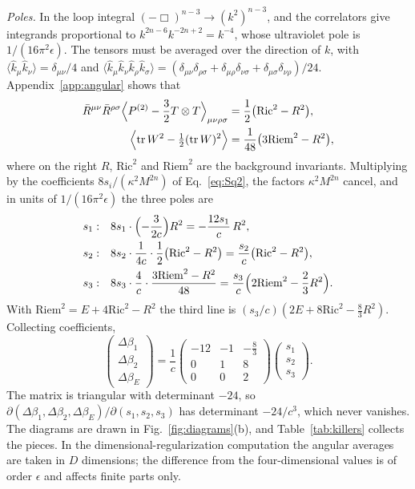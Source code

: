 \documentclass[a4paper,11pt]{article}
\newcommand{\Pt}{P^{(2)}}
\newcommand{\Ric}{\mathrm{Ric}}
\newcommand{\Riem}{\mathrm{Riem}}
\begin{document}
\textit{Poles.} In the loop integral $(-\Box)^{n-3}\to(k^2)^{n-3}$, and the correlators give integrands proportional to $k^{2n-6}k^{-2n+2}=k^{-4}$, whose ultraviolet pole is $1/(16\pi^2\epsilon)$. The tensors must be averaged over the direction of $k$, with $\langle\hat k_\mu\hat k_\nu\rangle=\delta_{\mu\nu}/4$ and $\langle\hat k_\mu\hat k_\nu\hat k_\rho\hat k_\sigma\rangle=(\delta_{\mu\nu}\delta_{\rho\sigma}+\delta_{\mu\rho}\delta_{\nu\sigma}+\delta_{\mu\sigma}\delta_{\nu\rho})/24$. Appendix~\ref{app:angular} shows that
\begin{align}
\bar R^{\mu\nu}\bar R^{\rho\sigma}\Bigl\langle\Pt-\frac32T\otimes T\Bigr\rangle_{\mu\nu\rho\sigma}&=\frac12\bigl(\Ric^2-R^2\bigr),\label{eq:angular}\\
\Bigl\langle\operatorname{tr}W^2-\tfrac12(\operatorname{tr}W)^2\Bigr\rangle&=\frac1{48}\bigl(3\Riem^2-R^2\bigr),\label{eq:angularRiem}
\end{align}
where on the right $R$, $\Ric^2$ and $\Riem^2$ are the background invariants. Multiplying by the coefficients $8s_i/(\kappa^2M^{2n})$ of Eq.~\eqref{eq:Sq2}, the factors $\kappa^2M^{2n}$ cancel, and in units of $1/(16\pi^2\epsilon)$ the three poles are
\begin{align*}
s_1:&\quad 8s_1\cdot\Bigl(-\frac3{2c}\Bigr)R^2=-\frac{12s_1}c\,R^2,\\
s_2:&\quad 8s_2\cdot\frac1{4c}\cdot\frac12\bigl(\Ric^2-R^2\bigr)=\frac{s_2}c\bigl(\Ric^2-R^2\bigr),\\
s_3:&\quad 8s_3\cdot\frac4c\cdot\frac{3\Riem^2-R^2}{48}=\frac{s_3}c\Bigl(2\Riem^2-\frac23R^2\Bigr).
\end{align*}
With $\Riem^2=E+4\Ric^2-R^2$ the third line is $(s_3/c)(2E+8\Ric^2-\frac83R^2)$. Collecting coefficients,
\begin{equation}
\label{eq:killcontrib}
\begin{pmatrix}\Delta\beta_1\\ \Delta\beta_2\\ \Delta\beta_E\end{pmatrix}=\frac1c
\begin{pmatrix}-12&-1&-\frac83\\ 0&1&8\\ 0&0&2\end{pmatrix}
\begin{pmatrix}s_1\\ s_2\\ s_3\end{pmatrix}.
\end{equation}
The matrix is triangular with determinant $-24$, so $\partial(\Delta\beta_1,\Delta\beta_2,\Delta\beta_E)/\partial(s_1,s_2,s_3)$ has determinant $-24/c^3$, which never vanishes. The diagrams are drawn in Fig.~\ref{fig:diagrams}(b), and Table~\ref{tab:killers} collects the pieces. In the dimensional-regularization computation the angular averages are taken in $D$ dimensions; the difference from the four-dimensional values is of order $\epsilon$ and affects finite parts only.
\end{document}
